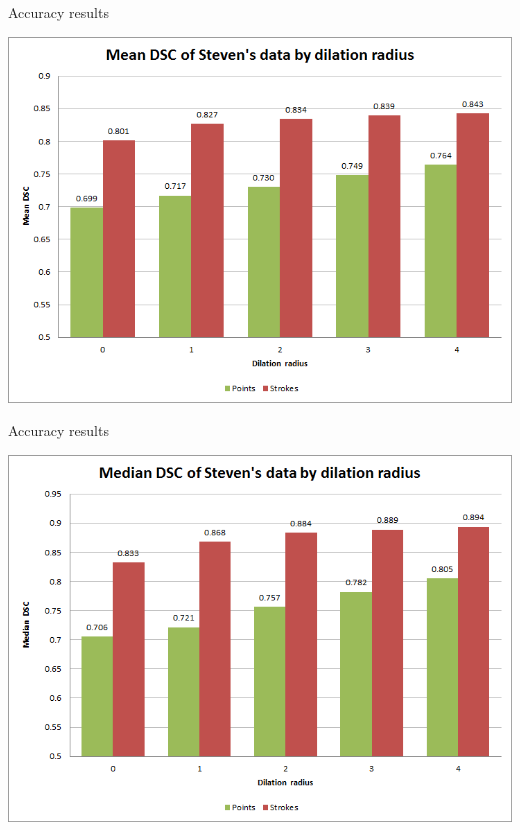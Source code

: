 \documentclass[14pt,xcolor=dvipsnames]{beamer}
\begin{document}
\begin{frame}[fragile,t]{Accuracy results}
	\begin{center}
		\includegraphics[width=\paperheight]{steven_mean_dsc}
	\end{center}
\end{frame}

\begin{frame}[fragile,t]{Accuracy results}
	\begin{center}
		\includegraphics[width=\paperheight]{steven_median_dsc}
	\end{center}
\end{frame}
\end{document}
